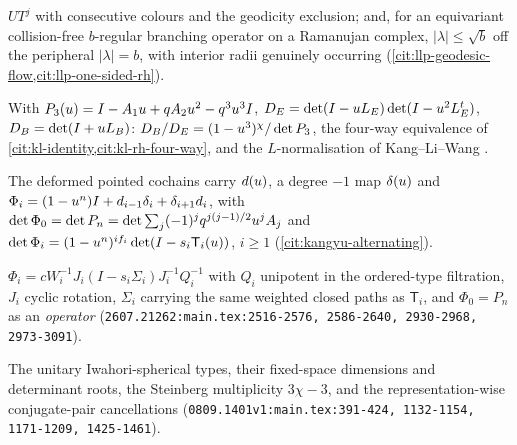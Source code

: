 \begin{assumption}
\label{asm:h-llp}
$UT^j$ with consecutive colours and the geodicity exclusion; and, for an
equivariant collision-free $b$-regular branching operator on a Ramanujan
complex, $|\lambda|\le\sqrt b$ off the peripheral $|\lambda| = b$, with interior
radii genuinely occurring (\cref{cit:llp-geodesic-flow,cit:llp-one-sided-rh}).
\end{assumption}

\begin{assumption}
\label{asm:h-kl}
With $P_3(u) = I-A_1u+q A_2u^2-q^3u^3I$,
$D_E = \det(I-u L_E)\det(I-u^2L_E^t)$, $D_B = \det(I+u L_B)$:
$D_B/D_E = (1-u^3)^{\chi}/\det P_3$, the four-way equivalence of
\cref{cit:kl-identity,cit:kl-rh-four-way}, and the $L$-normalisation of
Kang--Li--Wang \cite{kangliwang2018zeta}.
\end{assumption}

\begin{assumption}
\label{asm:h-ky}
The deformed pointed cochains carry $d(u)$, a degree $-1$ map $\delta(u)$
and $\Phi_i = (1-u^n)I+d_{i-1}\delta_i+\delta_{i+1}d_i$, with %
$\det\Phi_0 = \det P_n = \det\sum_j(-1)^jq^{j(j-1)/2}u^jA_j$ and %
$\det\Phi_i = (1-u^n)^{if_i}\det(I-s_i\mathsf T_i(u))$, $i\ge1$ %
(\cref{cit:kangyu-alternating}).
\end{assumption}

\begin{assumption}
\label{asm:h-ky-local}
$\Phi_i = cW_i^{-1}J_i(I-s_i\Sigma_i)J_i^{-1}Q_i^{-1}$ with $Q_i$ unipotent in %
the ordered-type filtration, $J_i$ cyclic rotation, $\Sigma_i$ carrying the same %
weighted closed paths as $\mathsf T_i$, and $\Phi_0 = P_n$ as an \emph{operator} %
(\texttt{2607.21262:main.tex:2516-2576, 2586-2640, 2930-2968, 2973-3091}).
\end{assumption}

\begin{assumption}
\label{asm:h-kl-table}
The unitary Iwahori-spherical types, their fixed-space dimensions and
determinant roots, the Steinberg multiplicity $3\chi-3$, and the
representation-wise conjugate-pair cancellations
(\texttt{0809.1401v1:main.tex:391-424, 1132-1154, 1171-1209, 1425-1461}).
\end{assumption}


